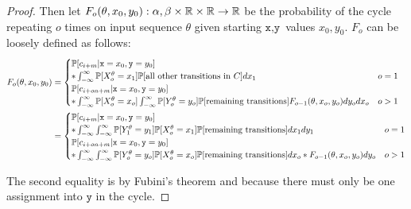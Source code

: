 \begin{proof}
	Then let $F_o(\theta, x_0, y_0):{\alpha, \beta}\times \mathbb{R} \times \mathbb{R} \to \mathbb{R}$ be the probability of the cycle repeating $o$ times on input sequence $\theta$ given starting $\texttt{x}, \texttt{y}$ values $x_0, y_0$. $F_o$ can be loosely defined as follows:\begin{align*}
		F_o(\theta, x_0, y_0) &= \begin{cases}
			\mathbb{P}[c_{i+m}|\texttt{x}=x_0, \texttt{y}=y_0]\\
			*\int_{-\infty}^\infty  \mathbb{P}[X_o^\theta=x_1]\mathbb{P}[\text{all other transitions in }C]dx_1 & o = 1\\
			\mathbb{P}[c_{i+on+m}|\texttt{x}=x_0, \texttt{y}=y_0]\\
			*\int_{-\infty}^\infty \mathbb{P}[X_o^\theta=x_o] \int_{-\infty}^\infty\mathbb{P}[Y_o^{\theta}=y_o]\mathbb{P}[\text{remaining transitions}] F_{o-1}(\theta, x_o, y_o)dy_odx_o & o > 1
		\end{cases}	\\
		&=\begin{cases}
			\mathbb{P}[c_{i+m}|\texttt{x}=x_0, \texttt{y}=y_0]\\
			*\int_{-\infty}^\infty \int_{-\infty}^\infty\mathbb{P}[Y_1^{\theta}=y_1]\mathbb{P}[X_o^\theta=x_1]\mathbb{P}[\text{remaining transitions}]dx_1dy_1 & o = 1\\
			\mathbb{P}[c_{i+on+m}|\texttt{x}=x_0, \texttt{y}=y_0]\\
			*\int_{-\infty}^\infty\int_{-\infty}^\infty\mathbb{P}[Y_o^{\theta}=y_o] \mathbb{P}[X_o^\theta=x_o] \mathbb{P}[\text{remaining transitions}]dx_o * F_{o-1}(\theta, x_o, y_o)dy_o & o > 1
		\end{cases}	
	\end{align*}
	
	The second equality is by Fubini's theorem and because there must only be one assignment into $\texttt{y}$ in the cycle. 


\end{proof}

